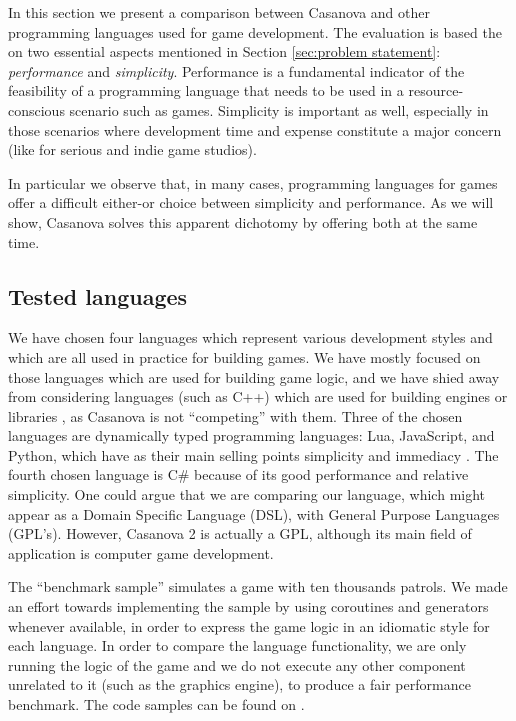 In this section we present a comparison between Casanova and other programming languages used for game development. The evaluation is based the on two essential aspects mentioned in Section \ref{sec:problem statement}: \textit{performance} and \textit{simplicity}. Performance is a fundamental indicator of the feasibility of a programming language that needs to be used in a resource-conscious scenario such as games. Simplicity is important as well, especially in those scenarios where development time and expense constitute a major concern (like for serious and indie game studios).


In particular we observe that, in many cases, programming languages for games offer a difficult either-or choice between simplicity and performance. As we will show, Casanova solves this apparent dichotomy by offering both at the same time.
\subsection{Tested languages}
\label{Languages tested}
We have chosen four languages which represent various development styles and which are all used in practice for building games. We have mostly focused on those languages which are used for building game logic, and we have shied away from considering languages (such as C++) which are used for building engines or libraries \cite{gregory2009game}, as Casanova is not ``competing'' with them. Three of the chosen languages are dynamically typed programming languages: Lua, JavaScript, and Python, which have as their main selling points simplicity and immediacy \cite{gutschmidt2004game}. The fourth chosen language is C\# because of its good performance and relative simplicity. One could argue that we are comparing our language, which might appear as a Domain Specific Language (DSL), with General Purpose Languages (GPL's). However, Casanova 2 is actually a GPL, although its main field of application is computer game development.

The ``benchmark sample'' simulates a game with ten thousands patrols. We made an effort towards implementing the sample by using coroutines and generators \cite{marlin1980coroutines} whenever available, in order to express the game logic in an idiomatic style for each language. In order to compare the language functionality, we are only running the logic of the game and we do not execute any other component unrelated to it (such as the graphics engine), to produce a fair performance benchmark. The code samples can be found on \cite{codeplexSource}.

